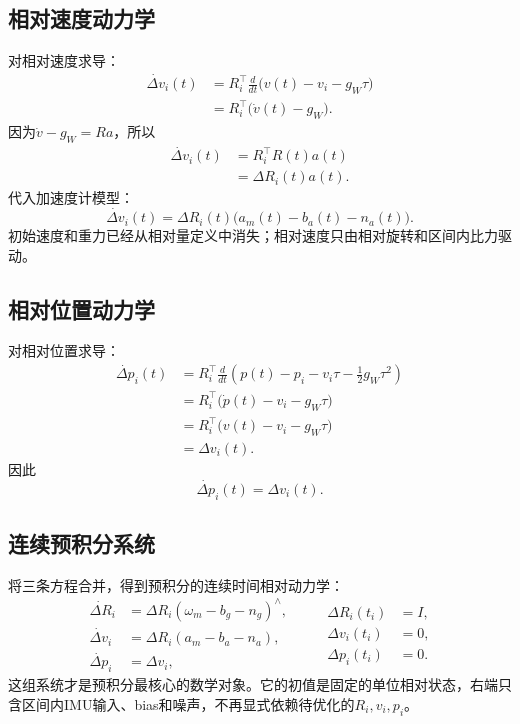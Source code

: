 \subsection{相对速度动力学}

对相对速度求导：
\[
\begin{aligned}
    \dot{\Delta v}_i(t)
    &=R_i^\top\frac{d}{dt}
      \bigl(v(t)-v_i-g_W\tau\bigr)\\
    &=R_i^\top\bigl(\dot v(t)-g_W\bigr).
\end{aligned}
\]
因为$\dot v-g_W=Ra$，所以
\[
\begin{aligned}
    \dot{\Delta v}_i(t)
    &=R_i^\top R(t)a(t)\\
    &=\Delta R_i(t)a(t).
\end{aligned}
\]
代入加速度计模型：
\[
\boxed{
    \dot{\Delta v}_i(t)
    =\Delta R_i(t)
    \bigl(a_m(t)-b_a(t)-n_a(t)\bigr).
}
\]
初始速度和重力已经从相对量定义中消失；相对速度只由相对旋转和区间内比力驱动。

\subsection{相对位置动力学}

对相对位置求导：
\[
\begin{aligned}
    \dot{\Delta p}_i(t)
    &=R_i^\top
      \frac{d}{dt}
      \left(
          p(t)-p_i-v_i\tau-\frac12g_W\tau^2
      \right)\\
    &=R_i^\top
      \bigl(\dot p(t)-v_i-g_W\tau\bigr)\\
    &=R_i^\top
      \bigl(v(t)-v_i-g_W\tau\bigr)\\
    &=\Delta v_i(t).
\end{aligned}
\]
因此
\[
\boxed{
    \dot{\Delta p}_i(t)=\Delta v_i(t).
}
\]

\subsection{连续预积分系统}

将三条方程合并，得到预积分的连续时间相对动力学：
\[
\boxed{
\begin{aligned}
    \dot{\Delta R}_i
    &=\Delta R_i(\omega_m-b_g-n_g)^\wedge,\\
    \dot{\Delta v}_i
    &=\Delta R_i(a_m-b_a-n_a),\\
    \dot{\Delta p}_i
    &=\Delta v_i,
\end{aligned}
\qquad
\begin{aligned}
    \Delta R_i(t_i)&=I,\\
    \Delta v_i(t_i)&=0,\\
    \Delta p_i(t_i)&=0.
\end{aligned}
}
\]
这组系统才是预积分最核心的数学对象。它的初值是固定的单位相对状态，右端只含区间内IMU输入、bias和噪声，不再显式依赖待优化的$R_i,v_i,p_i$。

